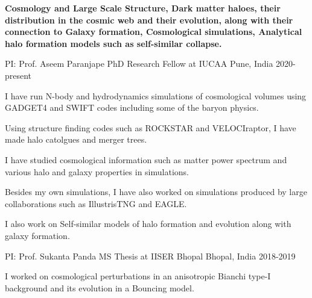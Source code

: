 


\textbf
{Cosmology and Large Scale Structure, Dark matter haloes, their distribution in the cosmic web and their evolution, along with their connection to Galaxy formation, Cosmological simulations, Analytical halo formation models such as self-similar collapse.}





\begin{cventries}

{
\cventry
{PI: Prof. Aseem Paranjape} %
{PhD Research Fellow at IUCAA} %
{Pune, India} %
{2020-present} %
{ %
\begin{cvitems}
\item {I have run N-body and hydrodynamics simulations of cosmological volumes using GADGET4 and SWIFT codes including some of the baryon physics.}
\item {Using structure finding codes such as ROCKSTAR and VELOCIraptor, I have made halo catolgues and merger trees.}
\item {I have studied cosmological information such as matter power spectrum and various halo and galaxy properties in simulations.}
\item {Besides my own simulations, I have also worked on simulations produced by large collaborations such as IllustrisTNG and EAGLE.}
\item {I also work on Self-similar models of halo formation and evolution along with galaxy formation.}
\end{cvitems}
}
}


{
\cventry
{PI: Prof. Sukanta Panda} %
{MS Thesis at IISER Bhopal} %
{Bhopal, India} %
{2018-2019} %
{ %
\begin{cvitems}
\item {I worked on cosmological perturbations in an anisotropic Bianchi type-I background and its evolution in a Bouncing model.}
\end{cvitems}
}
}

\end{cventries}


